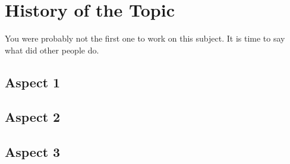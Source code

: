 
\section{History of the Topic} %
\label{sec:history}

You were probably not the first one to work on this subject.
It is time to say what did other people do.

\subsection{Aspect 1} %
\label{sub:aspect_1}

\lipsum[1-9]



\subsection{Aspect 2} %
\label{sub:aspect_2}

\lipsum[10-19]



\subsection{Aspect 3} %
\label{sub:aspect_3}

\lipsum[20-29]





